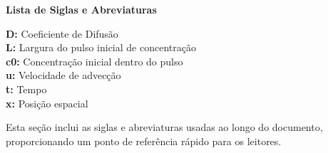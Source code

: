 \begin{titlepage}
    \thispagestyle{empty} %

    \noindent\textbf{\Large Lista de Siglas e Abreviaturas}

    \vspace{1cm} %

    \noindent \textbf{D:} Coeficiente de Difusão \\
    \noindent \textbf{L:} Largura do pulso inicial de concentração \\
    \noindent \textbf{c0:} Concentração inicial dentro do pulso \\
    \noindent \textbf{u:} Velocidade de advecção \\
    \noindent \textbf{t:} Tempo \\
    \noindent \textbf{x:} Posição espacial \\

    \vspace{0.4cm} %

    \noindent Esta seção inclui as siglas e abreviaturas usadas ao longo do documento, proporcionando um ponto de referência rápido para os leitores.

\end{titlepage}
